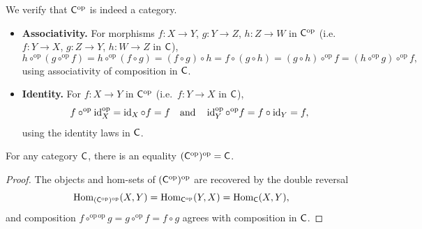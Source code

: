 \documentclass[../preamble]{subfiles}
\begin{document}
\begin{remark}
  \label{rem:opposite-axioms}
  We verify that $\mathsf{C}^{\mathrm{op}}$ is indeed a category.
  \begin{itemize}
    \item \textbf{Associativity.}
      For morphisms $f \colon X \to Y$, $g \colon Y \to Z$, $h \colon Z \to W$
      in $\mathsf{C}^{\mathrm{op}}$
      (i.e.\ $f \colon Y \to X$, $g \colon Z \to Y$, $h \colon W \to Z$ in $\mathsf{C}$),
      \[
        h \circ^{\mathrm{op}} (g \circ^{\mathrm{op}} f)
        = h \circ^{\mathrm{op}} (f \circ g)
        = (f \circ g) \circ h
        = f \circ (g \circ h)
        = (g \circ h) \circ^{\mathrm{op}} f
        = (h \circ^{\mathrm{op}} g) \circ^{\mathrm{op}} f,
      \]
      using associativity of composition in $\mathsf{C}$.

    \item \textbf{Identity.}
      For $f \colon X \to Y$ in $\mathsf{C}^{\mathrm{op}}$
      (i.e.\ $f \colon Y \to X$ in $\mathsf{C}$),
      \[
        f \circ^{\mathrm{op}} \operatorname{id}^{\mathrm{op}}_X
        = \operatorname{id}_X \circ f = f
        \quad \text{and} \quad
        \operatorname{id}^{\mathrm{op}}_Y \circ^{\mathrm{op}} f
        = f \circ \operatorname{id}_Y = f,
      \]
      using the identity laws in $\mathsf{C}$.
  \end{itemize}
\end{remark}

\begin{proposition}
  \label{prop:opposite-involution}
  For any category $\mathsf{C}$, there is an equality
  $(\mathsf{C}^{\mathrm{op}})^{\mathrm{op}} = \mathsf{C}$.
\end{proposition}

\begin{proof}
  The objects and hom-sets of $(\mathsf{C}^{\mathrm{op}})^{\mathrm{op}}$
  are recovered by the double reversal
  \[
    \operatorname{Hom}_{(\mathsf{C}^{\mathrm{op}})^{\mathrm{op}}}(X, Y)
    = \operatorname{Hom}_{\mathsf{C}^{\mathrm{op}}}(Y, X)
    = \operatorname{Hom}_{\mathsf{C}}(X, Y),
  \]
  and composition $f \circ^{\mathrm{op\,op}} g = g \circ^{\mathrm{op}} f = f \circ g$
  agrees with composition in $\mathsf{C}$.
\end{proof}

\end{document}
